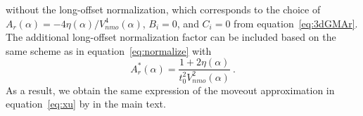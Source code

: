 without the long-offset normalization, which corresponds to the choice of $A_r(\alpha) = -4 \eta(\alpha)/V^4_{nmo}(\alpha)$, $B_i=0$, and $C_i=0$ from equation~\ref{eq:3dGMAr}. The additional long-offset normalization factor can be included based on the same scheme as in equation~\ref{eq:normalize} with 
\begin{equation}
\label{eq:xunormalize}
A^*_r(\alpha) = \frac{1+2\eta(\alpha)}{t_0^2V^2_{nmo}(\alpha)}~.
\end{equation}
As a result, we obtain the same expression of the moveout approximation in equation~\ref{eq:xu} by \cite{xu} in the main text.



\newpage
\onecolumn



